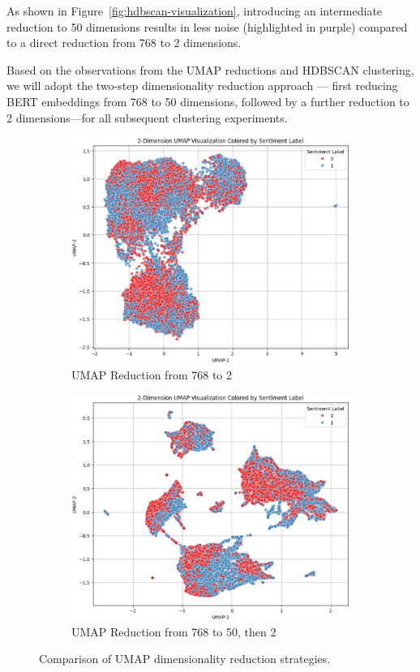\documentclass[twocolumn]{article}
\newcounter{ex}
\renewcommand{\indent}{\hspace*{2em}}
\begin{document}
\indent As shown in Figure~\ref{fig:hdbscan-visualization}, introducing an intermediate reduction to 50 dimensions results in less noise (highlighted in purple) compared to a direct reduction from 768 to 2 dimensions.

\indent Based on the observations from the UMAP reductions and HDBSCAN clustering, we will adopt the two-step dimensionality reduction approach — first reducing BERT embeddings from 768 to 50 dimensions, followed by a further reduction to 2 dimensions—for all subsequent clustering experiments. 
\begin{figure}[H]
    \centering
    \begin{subfigure}[b]{\linewidth}
        \includegraphics[width=\linewidth]{768-2.eps}
        \caption{UMAP Reduction from 768 to 2}
    \end{subfigure}
    \begin{subfigure}[b]{\linewidth}
        \includegraphics[width=\linewidth]{768-50-2.eps}
        \caption{UMAP Reduction from 768 to 50, then 2}
    \end{subfigure}
    \caption{Comparison of UMAP dimensionality reduction strategies.}
    \label{fig:umap76850}
\end{figure}
\end{document}
